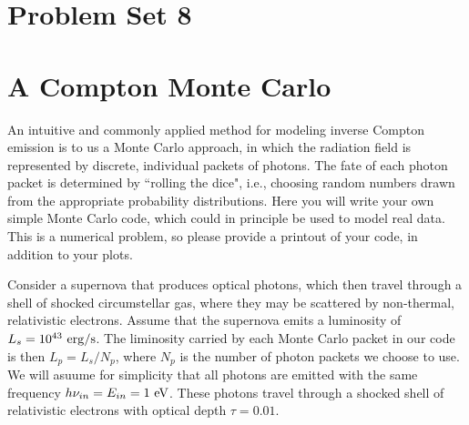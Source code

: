 \documentclass[11pt]{article}
\begin{document}
\pagestyle{empty}

\section*{\centering Problem Set 8}

\section{A Compton Monte Carlo}

An intuitive and commonly applied method for modeling inverse Compton
emission is to us a Monte Carlo approach, in which the radiation field is
represented by discrete, individual packets of photons. The fate of each photon
packet is determined by ``rolling the dice", i.e., choosing random numbers drawn
from the appropriate probability distributions. Here you will write your own
simple Monte Carlo code, which could in principle be used to model real data.
This is a numerical problem, so please provide a printout of your code, in
addition to your plots.

Consider a supernova that produces optical photons, which then travel through a
shell of shocked circumstellar gas, where they may be scattered by non-thermal,
relativistic electrons. Assume that the supernova emits a luminosity of
$L_s=10^{43}~{\rm erg}/{\rm s}$.  The liminosity carried by each Monte
Carlo packet in our code is then $L_p=L_s/N_p$, where $N_p$ is the number of
photon packets we choose to use.  We will asuume for simplicity that all photons are emitted with
the same frequency $h\nu_{in}=E_{in}=1~{\rm eV}$.  
These photons travel through a shocked shell of relativistic electrons with optical depth
$\tau=0.01$.
\end{document}
